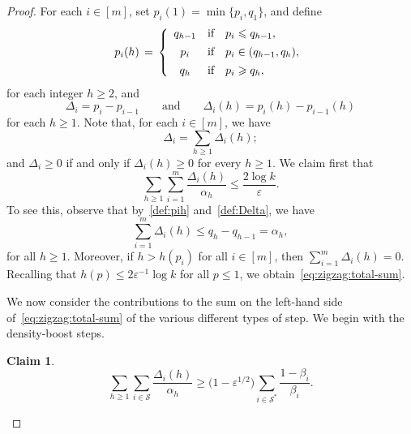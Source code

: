\documentclass[12pt,reqno]{amsart}
\newtheorem{claim}[theorem]{Claim}
\theoremstyle{definition}
\theoremstyle{remark}
\def\cS{\mathcal{S}}
\newcommand\eps{\varepsilon}
\renewcommand{\le}{\leqslant}
\renewcommand{\ge}{\geqslant}
\def\eps{\varepsilon}
\begin{document}
\begin{proof}
For each $i \in [m]$, set $p_i(1) = \min\{ p_i, q_1 \}$, and define  
\begin{equation}\label{def:pih}
    p_i(h) \,=\, \left\{
    \begin{array} {c@{\quad \textup{if} \quad}l}
      q_{h-1} & p_i \le q_{h-1}, \\[+1ex]
      p_i & p_i \in (q_{h-1},q_h), \\[+1ex]
      q_{h} & p_i \ge q_h,
    \end{array}\right.
\end{equation}
for each integer $h \ge 2$, and
\begin{equation}\label{def:Delta}
\Delta_i = p_i - p_{i-1} \qquad \text{and} \qquad \Delta_i(h) = p_i(h) - p_{i-1}(h)
\end{equation} 
for each %
$h \ge 1$. Note that, for each $i \in [m]$, we have
\begin{equation}\label{eq:Delta:is:sum:of:Deltas} 
\Delta_i = \sum_{h \ge 1} \Delta_i(h);
\end{equation} 
and $\Delta_i \ge 0$ if and only if $\Delta_i(h) \ge 0$ for every $h \ge 1$. We claim first that
\begin{equation} \label{eq:zigzag:total-sum}  
\sum_{h \ge 1} \sum_{i = 1}^m \frac{\Delta_i(h)}{\alpha_h} \le \frac{2\log k}{\eps}.
\end{equation}
To see this, observe that by~\eqref{def:pih} and~\eqref{def:Delta}, we have
$$\sum_{i = 1}^m \Delta_i(h) \le q_h - q_{h-1} = \alpha_h,$$
for all $h \ge 1$. Moreover, if $h > h(p_i)$ for all $i \in [m]$, then $\sum_{i = 1}^m \Delta_i(h) = 0$. Recalling that $h(p) \le 2\eps^{-1} \log k$ for all $p \le 1$, we obtain~\eqref{eq:zigzag:total-sum}. 

We now consider the contributions to the sum on the left-hand side of~\eqref{eq:zigzag:total-sum} of the various different types of step. We begin with the density-boost steps.

\begin{claim}\label{claim:S:sum}
$$\sum_{h \ge 1} \sum_{i \in \cS} \frac{\Delta_i(h)}{\alpha_h} \ge \big( 1 - \eps^{1/2} \big) \sum_{i \in \cS^*} \frac{1-\beta_i}{\beta_i}.$$
\end{claim}


\end{proof}
\end{document}
